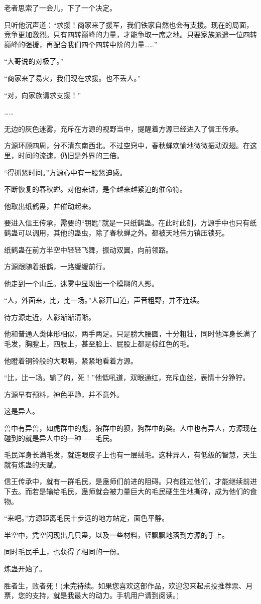 \begin{this_body}
老者思索了一会儿，下了一个决定。

只听他沉声道：“求援！商家来了援军，我们铁家自然也会有支援。现在的局面，竞争更加激烈。只有四转巅峰的力量，才能争取一席之地。只要家族派遣一位四转巅峰的强援，再配合我们四个四转中阶的力量……”

“大哥说的对极了。”

“商家来了易火，我们现在求援。也不丢人。”

“对，向家族请求支援！”

……

无边的灰色迷雾，充斥在方源的视野当中，提醒着方源已经进入了信王传承。

方源环顾四周，分不清东南西北。不过空窍中，春秋蝉欢愉地微微振动双翅。在这里，时间的流速，仍旧是外界的三倍。

“得抓紧时间。”方源心中有一股紧迫感。

不断恢复的春秋蝉。对他来讲，是个越来越紧迫的催命符。

他取出纸鹤蛊，并催动起来。

要进入信王传承，需要的“钥匙”就是一只纸鹤蛊。在此时此刻，方源手中也只有纸鹤蛊可以调用，其他的蛊虫，除了春秋蝉之外。都被天地伟力镇压锁死。

纸鹤蛊在前方半空中轻轻飞舞，振动双翼，向前领路。

方源跟随着纸鹤，一路缓缓前行。

他走到一个山丘。迷雾中显现出一个模糊的人影。

“人，外面来，比，比一场。”人影开口道，声音粗野，并不连续。

待方源走近，人影渐渐清晰。

他和普通人类体形相似，两手两足。只是膀大腰圆，十分粗壮，同时他浑身长满了毛发，胸膛上，四肢上，甚至脸上、屁股上都是棕红色的毛。

他瞪着铜铃般的大眼睛，紧紧地看着方源。

“比，比一场。输了的，死！”他低吼道，双眼通红，充斥血丝，表情十分狰狞。

方源早有预料，神色平静，并不意外。

这是异人。

兽中有异兽，如虎群中的彪，狼群中的狈，狗群中的獒。人中也有异人，方源现在碰到的就是异人中的一种——毛民。

毛民浑身长满毛发，就连眼皮子上也有一层绒毛。这种异人，有低级的智慧，天生就有炼蛊的天赋。

信王传承中，就有一群毛民，是蛊师们前进的阻碍。只有胜过他们，才能继续前进下去。而若是输给毛民，蛊师就会被力量巨大的毛民硬生生地撕碎，成为他们的食物。

“来吧。”方源距离毛民十步远的地方站定，面色平静。

半空中，凭空闪现出几只蛊，以及一些材料，轻飘飘地落到方源的手上。

同时毛民手上，也获得了相同的一份。

炼蛊开始了。

胜者生，败者死！(未完待续。如果您喜欢这部作品，欢迎您来起点投推荐票、月票，您的支持，就是我最大的动力。手机用户请到阅读。)

\end{this_body}

